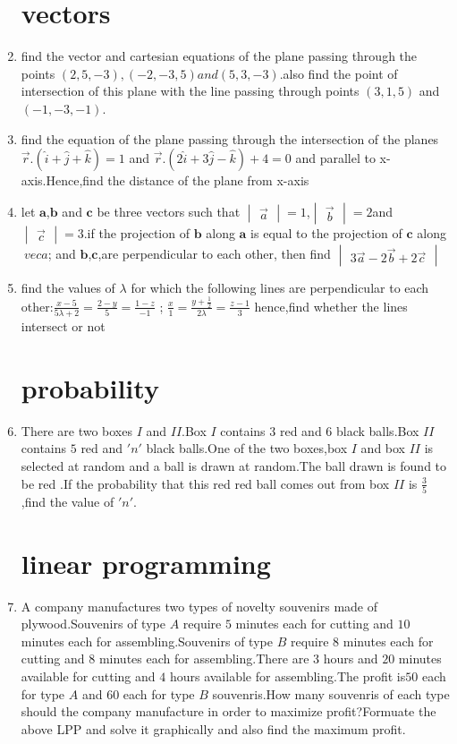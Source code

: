 \documentclass[10pt,-letter paper]{article}
\let\vec\mathbf{}
\let\vec\mathbf{}
\let\vec\mathbf{}
\providecommand{\brak}[1]{\ensuremath{\left(#1\right)}}
\newcommand{\mydet}[1]{\ensuremath{\begin{vmatrix}#1\end{vmatrix}}}
\begin{document}
\begin{enumerate}
\section{vectors}
\item find the vector and cartesian equations of the plane passing through the points $\brak{2,5,-3},\brak{-2,-3,5} and \brak{5,3,-3}$.also find the point of intersection of this plane with the line passing through points $\brak{3,1,5}$ and $\brak{-1 ,-3,-1}$.
\item find the equation of the plane passing through the intersection of the planes $\overrightarrow{r}. \brak{\hat{i}+\hat{j}+\hat{k}}=1$ and $\overrightarrow{r} .\brak{2\hat{i}+3\hat{j}-\hat{k}}+4=0$ and parallel to x-axis.Hence,find the distance of the plane from x-axis 
\item let $\vec{a}$,$\vec{b}$ and $\vec{c}$ be three vectors such that $\mydet{\overrightarrow{a}}=1$,$\mydet{\overrightarrow{b}}=2$and $\mydet{\overrightarrow{c}}=3$.if the projection of $\vec{b}    $ along $\vec{a}$ is equal to the projection of $\vec{c}$ along $\    vec{a}$; and $\vec{b}$,$\vec{c}$,are perpendicular to each other,     then find $\mydet{3\overrightarrow{a}-2\overrightarrow{b}+2\overrightarrow{c}}$                             
\item find the values of $\lambda$ for which the following lines are perpendicular to each other:$\frac{x-5}{5\lambda+2}=\frac{2-y}{5}=\frac{1-z}{-1}$ ; $\frac{x}{1}=\frac{y+\frac{1}{2}}{2\lambda}=\frac{z-1}{3}$ hence,find whether the lines intersect or not

\section{probability}
\item There are two boxes $I$ and $II$.Box $I$ contains $3$ red and $6$ black balls.Box $II$ contains $5$ red and $'n'$ black balls.One of the two boxes,box $I$ and box $II$ is selected at random and a ball is drawn at random.The ball drawn is found to be red .If the probability that this red red ball comes out from box $II$ is $\frac{3}{5}$,find the value of $'n'$.

\section{linear programming}
\item A company manufactures two types of novelty souvenirs made of plywood.Souvenirs of type $A$ require $5$ minutes each for cutting and $10$ minutes each for assembling.Souvenirs of type $B$ require $8$ minutes each for cutting and $8$ minutes each for assembling.There are $3$ hours and $20$ minutes available for cutting and $4$ hours available for assembling.The profit is\rupee $50$ each for type $A$ and \rupee $60$ each for type $B$ souvenris.How many souvenris of each type should the company manufacture in order to maximize profit?Formuate the above LPP and solve it graphically and also find the maximum profit.
\end{enumerate}
\end{document}
